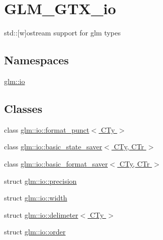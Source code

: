 \hypertarget{group__gtx__io}{}\section{G\+L\+M\+\_\+\+G\+T\+X\+\_\+io}
\label{group__gtx__io}


std\+:\+:\mbox{[}w\mbox{]}ostream support for glm types  


\subsection*{Namespaces}
\begin{DoxyCompactItemize}
\item 
 \hyperlink{namespaceglm_1_1io}{glm\+::io}
\end{DoxyCompactItemize}
\subsection*{Classes}
\begin{DoxyCompactItemize}
\item 
class \hyperlink{classglm_1_1io_1_1format__punct}{glm\+::io\+::format\+\_\+punct$<$ C\+Ty $>$}
\item 
class \hyperlink{classglm_1_1io_1_1basic__state__saver}{glm\+::io\+::basic\+\_\+state\+\_\+saver$<$ C\+Ty, C\+Tr $>$}
\item 
class \hyperlink{classglm_1_1io_1_1basic__format__saver}{glm\+::io\+::basic\+\_\+format\+\_\+saver$<$ C\+Ty, C\+Tr $>$}
\item 
struct \hyperlink{structglm_1_1io_1_1precision}{glm\+::io\+::precision}
\item 
struct \hyperlink{structglm_1_1io_1_1width}{glm\+::io\+::width}
\item 
struct \hyperlink{structglm_1_1io_1_1delimeter}{glm\+::io\+::delimeter$<$ C\+Ty $>$}
\item 
struct \hyperlink{structglm_1_1io_1_1order}{glm\+::io\+::order}
\end{DoxyCompactItemize}

